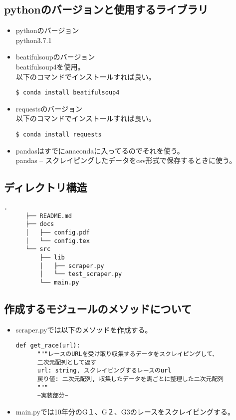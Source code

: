 \documentclass{jsarticle}
\begin{document}
  \subsection{pythonのバージョンと使用するライブラリ}
    \begin{itemize}
      \item pythonのバージョン\\
        python3.7.1

      \item beatifulsoupのバージョン\\
        beatifulsoup4を使用。\\
        以下のコマンドでインストールすれば良い。
\begin{lstlisting}[caption=install command,label=ラベル2]
  $ conda install beatifulsoup4
\end{lstlisting}

      \item requestsのバージョン\\
        以下のコマンドでインストールすれば良い。
\begin{lstlisting}[caption=install command,label=ラベル3]
  $ conda install requests
\end{lstlisting}

      \item pandasはすでにanacondaに入ってるのでそれを使う。\\
      pandas -- スクレイピングしたデータをcsv形式で保存するときに使う。
    \end{itemize}

  \subsection{ディレクトリ構造}
    \begin{lstlisting}[caption=プロジェクトのディレクトリ構造,label=ラベル4]
      .
      ├── README.md
      ├── docs
      │   ├── config.pdf
      │   └── config.tex
      └── src
          ├── lib
          │   ├── scraper.py
          │   └── test_scraper.py
          └── main.py
    \end{lstlisting}

  \subsection{作成するモジュールのメソッドについて}
    \begin{itemize}
      \item   scraper.pyでは以下のメソッドを作成する。
\begin{lstlisting}[caption=install command,label=ラベル5]
  def get_race(url):
      """レースのURLを受け取り収集するデータをスクレイピングして、
      二次元配列として返す
      url: string, スクレイピングするレースのurl
      戻り値: 二次元配列, 収集したデータを馬ごとに整理した二次元配列
      """
      ~実装部分~
\end{lstlisting}

      \item main.pyでは10年分のG１、G２、G3のレースをスクレイピングする。
    \end{itemize}
\end{document}
